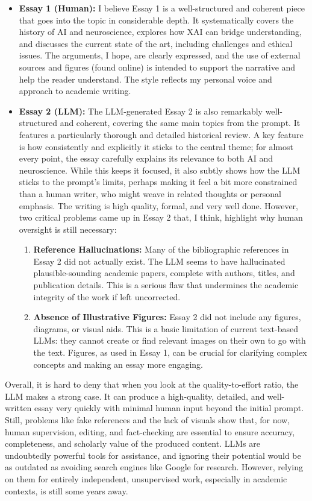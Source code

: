 \documentclass[11pt,a4paper]{article}
\begin{document}
\begin{itemize}
    \item \textbf{Essay 1 (Human):} I believe Essay 1 is a well-structured and coherent piece that goes into the topic in considerable depth. It systematically covers the history of AI and neuroscience, explores how XAI can bridge understanding, and discusses the current state of the art, including challenges and ethical issues. The arguments, I hope, are clearly expressed, and the use of external sources and figures (found online) is intended to support the narrative and help the reader understand. The style reflects my personal voice and approach to academic writing.

    \item \textbf{Essay 2 (LLM):} The LLM-generated Essay 2 is also remarkably well-structured and coherent, covering the same main topics from the prompt. It features a particularly thorough and detailed historical review. A key feature is how consistently and explicitly it sticks to the central theme; for almost every point, the essay carefully explains its relevance to both AI and neuroscience. While this keeps it focused, it also subtly shows how the LLM sticks to the prompt's limits, perhaps making it feel a bit more constrained than a human writer, who might weave in related thoughts or personal emphasis. The writing is high quality, formal, and very well done.
    However, two critical problems came up in Essay 2 that, I think, highlight why human oversight is still necessary:
    \begin{enumerate}
        \item \textbf{Reference Hallucinations:} Many of the bibliographic references in Essay 2 did not actually exist. The LLM seems to have hallucinated plausible-sounding academic papers, complete with authors, titles, and publication details. This is a serious flaw that undermines the academic integrity of the work if left uncorrected.
        \item \textbf{Absence of Illustrative Figures:} Essay 2 did not include any figures, diagrams, or visual aids. This is a basic limitation of current text-based LLMs: they cannot create or find relevant images on their own to go with the text. Figures, as used in Essay 1, can be crucial for clarifying complex concepts and making an essay more engaging.
    \end{enumerate}
\end{itemize}

Overall, it is hard to deny that when you look at the quality-to-effort ratio, the LLM makes a strong case. It can produce a high-quality, detailed, and well-written essay very quickly with minimal human input beyond the initial prompt. Still, problems like fake references and the lack of visuals show that, for now, human supervision, editing, and fact-checking are essential to ensure accuracy, completeness, and scholarly value of the produced content. LLMs are undoubtedly powerful tools for assistance, and ignoring their potential would be as outdated as avoiding search engines like Google for research. However, relying on them for entirely independent, unsupervised work, especially in academic contexts, is still some years away.
\end{document}
